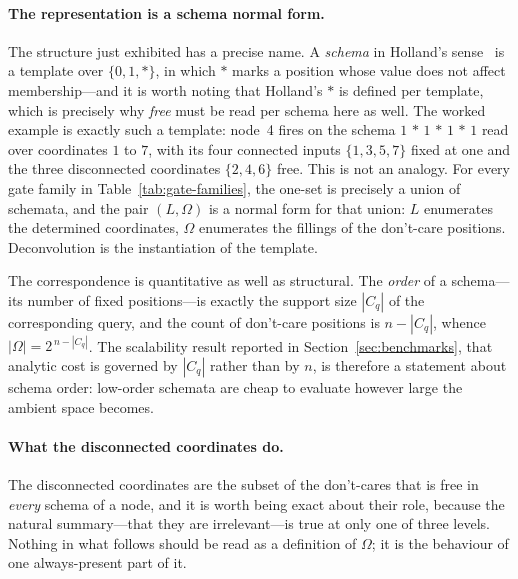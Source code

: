 \documentclass[11pt]{article}
\begin{document}
\paragraph{The representation is a schema normal form.}
The structure just exhibited has a precise name.  A \emph{schema} in
Holland's sense~\cite{holland1975} is a template over $\{0,1,*\}$, in which
$*$ marks a position whose value does not affect membership---and it is worth
noting that Holland's $*$ is defined per template, which is precisely why
\emph{free} must be read per schema here as well.  The worked
example is exactly such a template: node~4 fires on the schema
$1\,\ast\,1\,\ast\,1\,\ast\,1$ read over coordinates $1$ to $7$, with its four
connected inputs $\{1,3,5,7\}$ fixed at one and the three disconnected
coordinates $\{2,4,6\}$ free.  This is not an analogy.  For every gate family in
Table~\ref{tab:gate-families}, the one-set is precisely a union of schemata,
and the pair $(L,\Omega)$ is a normal form for that union: $L$ enumerates
the determined coordinates, $\Omega$ enumerates the fillings of the
don't-care positions.  Deconvolution is the instantiation of the template.

The correspondence is quantitative as well as structural.  The \emph{order}
of a schema---its number of fixed positions---is exactly the support size
$|C_q|$ of the corresponding query, and the count of don't-care positions is
$n-|C_q|$, whence $|\Omega|=2^{\,n-|C_q|}$.  The scalability result reported
in Section~\ref{sec:benchmarks}, that analytic cost is governed by $|C_q|$
rather than by $n$, is therefore a statement about schema order: low-order
schemata are cheap to evaluate however large the ambient space becomes.

\paragraph{What the disconnected coordinates do.}
The disconnected coordinates are the subset of the don't-cares that is free in
\emph{every} schema of a node, and it is worth being exact about their role,
because the natural summary---that they are irrelevant---is true at only one of
three levels.  Nothing in what follows should be read as a definition of
$\Omega$; it is the behaviour of one always-present part of it.
\end{document}
